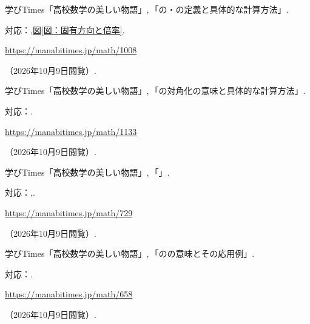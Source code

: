\begin{enumerate}[resume,label={[\arabic*]}]
    \item \begin{minipage}[t]{\linewidth}\raggedright
        学びTimes「高校数学の美しい物語」,\,「の・の定義と具体的な計算方法」.
        \par{\small 対応：,\hyperref[図：固有方向と倍率]{図\ref*{図：固有方向と倍率}}.\par}
        \par\noindent\url{https://manabitimes.jp/math/1008}\par
        \noindent（2026年10月9日閲覧）.
      \end{minipage}\par\smallskip

    \item \begin{minipage}[t]{\linewidth}\raggedright
        学びTimes「高校数学の美しい物語」,\,「の対角化の意味と具体的な計算方法」.
        \par{\small 対応：.\par}
        \par\noindent\url{https://manabitimes.jp/math/1133}\par
        \noindent（2026年10月9日閲覧）.
      \end{minipage}\par\smallskip

    \item \begin{minipage}[t]{\linewidth}\raggedright
        学びTimes「高校数学の美しい物語」,\,「」.
        \par{\small 対応：,.\par}
        \par\noindent\url{https://manabitimes.jp/math/729}\par
        \noindent（2026年10月9日閲覧）.
      \end{minipage}\par\smallskip

    \item \begin{minipage}[t]{\linewidth}\raggedright
        学びTimes「高校数学の美しい物語」,\,「のの意味とその応用例」.
        \par{\small 対応：.\par}
        \par\noindent\url{https://manabitimes.jp/math/658}\par
        \noindent（2026年10月9日閲覧）.
      \end{minipage}\par\smallskip


\end{enumerate}
